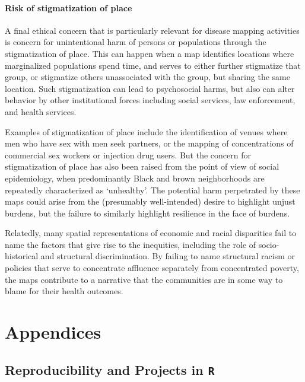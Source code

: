 \documentclass[
]{book}
\begin{document}
\hypertarget{risk-of-stigmatization-of-place}{%
\subsection{Risk of stigmatization of place}\label{risk-of-stigmatization-of-place}}

A final ethical concern that is particularly relevant for disease mapping activities is concern for unintentional harm of persons or populations through the stigmatization of place. This can happen when a map identifies locations where marginalized populations spend time, and serves to either further stigmatize that group, or stigmatize others unassociated with the group, but sharing the same location. Such stigmatization can lead to psychosocial harms, but also can alter behavior by other institutional forces including social services, law enforcement, and health services.

Examples of stigmatization of place include the identification of venues where men who have sex with men seek partners, or the mapping of concentrations of commercial sex workers or injection drug users. But the concern for stigmatization of place has also been raised from the point of view of social epidemiology, when predominantly Black and brown neighborhoods are repeatedly characterized as `unhealthy'. The potential harm perpetrated by these maps could arise from the (presumably well-intended) desire to highlight unjust burdens, but the failure to similarly highlight resilience in the face of burdens.

Relatedly, many spatial representations of economic and racial disparities fail to name the factors that give rise to the inequities, including the role of socio-historical and structural discrimination. By failing to name structural racism or policies that serve to concentrate affluence separately from concentrated poverty, the maps contribute to a narrative that the communities are in some way to blame for their health outcomes.

\hypertarget{part-appendices}{%
\part{Appendices}\label{part-appendices}}

\hypertarget{reproducibility-and-projects-in-r}{%
\chapter{\texorpdfstring{Reproducibility and Projects in \texttt{R}}{Reproducibility and Projects in R}}\label{reproducibility-and-projects-in-r}}
\end{document}
